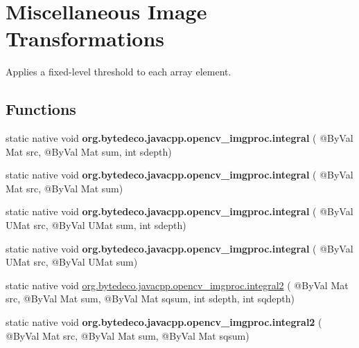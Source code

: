 \hypertarget{group__imgproc__misc}{}\section{Miscellaneous Image Transformations}
\label{group__imgproc__misc}


Applies a fixed-\/level threshold to each array element.  


\subsection*{Functions}
\begin{DoxyCompactItemize}
\item 
\mbox{\label{group__imgproc__misc_gab0098b88cb43ba8e3cc4c2e5b69d7309}} 
static native void {\bfseries org.\+bytedeco.\+javacpp.\+opencv\+\_\+imgproc.\+integral} ( @By\+Val Mat src, @By\+Val Mat sum, int sdepth)
\item 
\mbox{\label{group__imgproc__misc_gaaf7d4b47eeb310303fc4eebfe0fe9ce0}} 
static native void {\bfseries org.\+bytedeco.\+javacpp.\+opencv\+\_\+imgproc.\+integral} ( @By\+Val Mat src, @By\+Val Mat sum)
\item 
\mbox{\label{group__imgproc__misc_gafa36efd2172305ff556e12fdb84d1838}} 
static native void {\bfseries org.\+bytedeco.\+javacpp.\+opencv\+\_\+imgproc.\+integral} ( @By\+Val U\+Mat src, @By\+Val U\+Mat sum, int sdepth)
\item 
\mbox{\label{group__imgproc__misc_ga9b664db83206574b7b96ebadbad58b62}} 
static native void {\bfseries org.\+bytedeco.\+javacpp.\+opencv\+\_\+imgproc.\+integral} ( @By\+Val U\+Mat src, @By\+Val U\+Mat sum)
\item 
static native void \hyperlink{group__imgproc__misc_ga7c3e8cf075507c80c07a1fd8cd8969de}{org.\+bytedeco.\+javacpp.\+opencv\+\_\+imgproc.\+integral2} ( @By\+Val Mat src, @By\+Val Mat sum, @By\+Val Mat sqsum, int sdepth, int sqdepth)
\item 
\mbox{\label{group__imgproc__misc_gae63ae0ac675b6a1c3c17de7d5afd2bb9}} 
static native void {\bfseries org.\+bytedeco.\+javacpp.\+opencv\+\_\+imgproc.\+integral2} ( @By\+Val Mat src, @By\+Val Mat sum, @By\+Val Mat sqsum)

\end{DoxyCompactItemize}
